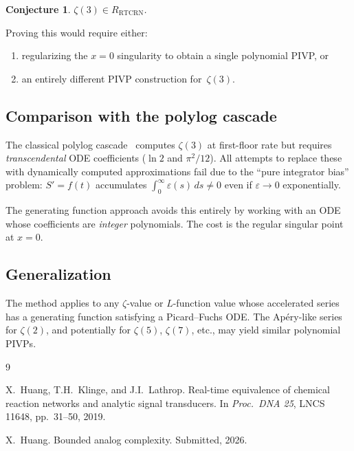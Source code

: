 \documentclass[11pt]{article}
\newtheorem{conjecture}[theorem]{Conjecture}
\newcommand{\RTCRN}{R_{\mathrm{RTCRN}}}
\begin{document}
\begin{conjecture}
$\zeta(3) \in \RTCRN$.
\end{conjecture}

Proving this would require either:
\begin{enumerate}
\item[(a)] regularizing the $x = 0$ singularity to obtain a single polynomial PIVP, or
\item[(b)] an entirely different PIVP construction for~$\zeta(3)$.
\end{enumerate}

\subsection{Comparison with the polylog cascade}

The classical polylog cascade~\cite{BAC} computes $\zeta(3)$
at first-floor rate but requires \emph{transcendental} ODE coefficients
($\ln 2$ and $\pi^2/12$). All attempts to replace these with dynamically
computed approximations fail due to the ``pure integrator bias'' problem:
$S' = f(t)$ accumulates $\int_0^\infty \varepsilon(s)\,ds \ne 0$
even if $\varepsilon \to 0$ exponentially.

The generating function approach avoids this entirely by working with an ODE
whose coefficients are \emph{integer} polynomials. The cost is the regular
singular point at $x = 0$.

\subsection{Generalization}

The method applies to any $\zeta$-value or $L$-function value
whose accelerated series has a generating function satisfying a Picard--Fuchs ODE.
The Ap\'ery-like series for $\zeta(2)$, and potentially for $\zeta(5)$, $\zeta(7)$, etc.,
may yield similar polynomial PIVPs.

\begin{thebibliography}{9}

X.~Huang, T.H.~Klinge, and J.I.~Lathrop.
\newblock Real-time equivalence of chemical reaction networks and analytic
  signal transducers.
\newblock In \emph{Proc.\ DNA 25}, LNCS 11648, pp.~31--50, 2019.

X.~Huang.
\newblock Bounded analog complexity.
\newblock Submitted, 2026.

\end{thebibliography}
\end{document}
